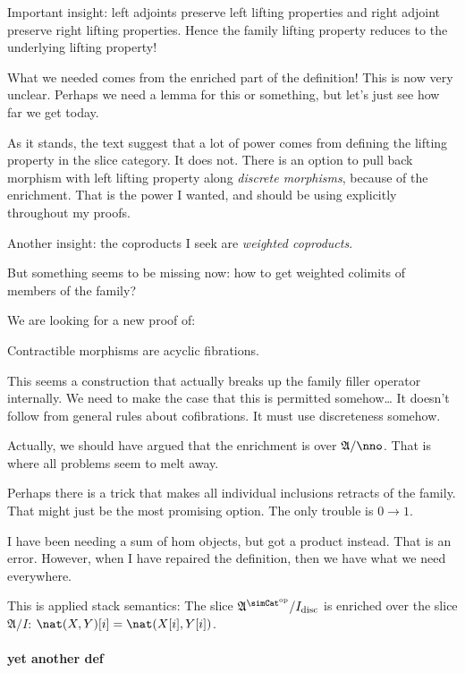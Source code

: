 \documentclass{tac}
\newcommand\dual{^{\mathrm{op}}}
\newcommand\s{^{\simCat\dual}}
\newcommand\ambient{\mathfrak A}
\newcommand\disc{_{\rm disc}}
\begin{document}
Important insight: left adjoints preserve left lifting properties and right adjoint preserve right lifting properties. 
Hence the family lifting property reduces to the underlying lifting property!

What we needed comes from the enriched part of the definition! This is now very unclear.
Perhaps we need a lemma for this or something, but let's just see how far we get today.

As it stands, the text suggest that a lot of power comes from defining the lifting property in the slice category. It does not. 
There is an option to pull back morphism with left lifting property along \emph{discrete morphisms}, because of the enrichment. 
That is the power I wanted, and should be using explicitly throughout my proofs.

Another insight: the coproducts I seek are \emph{weighted coproducts}.

But something seems to be missing now: how to get weighted colimits of members of the family?

We are looking for a new proof of:
\begin{lemma} Contractible morphisms are acyclic fibrations.\end{lemma}
This seems a construction that actually breaks up the family filler operator internally.
We need to make the case that this is permitted somehow\dots
It doesn't follow from general rules about cofibrations. It must use discreteness somehow.

Actually, we should have argued that the enrichment is over $\ambient/\nno$.
That is where all problems seem to melt away.

Perhaps there is a trick that makes all individual inclusions retracts of the family. 
That might just be the most promising option.
The only trouble is $0\to 1$.


I have been needing a sum of hom objects, but got a product instead.
That is an error. However, when I have repaired the definition, then we have what we need everywhere.

This is applied stack semantics:
The slice $\ambient\s/I\disc$ is enriched over the slice $\ambient/I$: $\nat(X,Y)[i] = \nat(X[i],Y[i])$.

\paragraph{yet another def}
\end{document}
